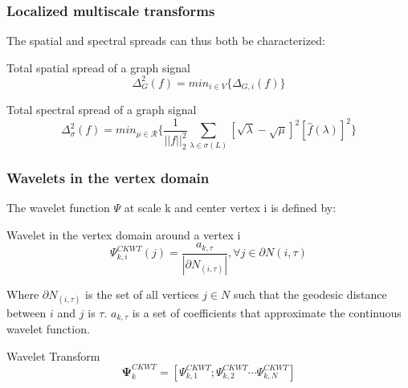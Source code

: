 \documentclass{beamer}
\begin{document}
\begin{frame}
  \frametitle{Localized multiscale transforms}
  
  The spatial and spectral spreads can thus both be characterized:

  \begin{block}{Total spatial spread of a graph signal}
    \begin{equation}
      \Delta_{G}^2(f) = min_{i \in V} \{ \Delta_{G, i} (f) \}
    \end{equation}
  \end{block}  
  \begin{block}{Total spectral spread of a graph signal}
    \begin{equation}
      \Delta_{\sigma}^2(f) = min_{\mu \in \mathcal{R}} \bigg\{ \frac{1}{|| f ||_2^2} \sum_{\lambda \in \sigma(L)} [\sqrt{\lambda} - \sqrt{\mu}]^2 [\hat{f}(\lambda)]^2 \bigg\}
    \end{equation}
  \end{block}  
 \end{frame} 
  
 \begin{frame}
   \frametitle{Wavelets in the vertex domain}
    The wavelet function $\Psi$ at scale k and center vertex i is defined by:

  \begin{block}{Wavelet in the vertex domain around a vertex i}
  \begin{equation}
  \Psi_{k,i}^{CKWT} (j) = \frac{a_{k, \tau}}{|\partial N_{(i, \tau)}|}, \forall j \in \partial N(i, \tau)
  \end{equation}
  \end{block}

  Where $\partial N_{(i, \tau)}$ is the set of all vertices $j \in N$ such that the geodesic distance between $i$ and $j$ is $\tau$. $a_{k, \tau}$ is a set of coefficients that approximate the continuous wavelet function. 

  \begin{block}{Wavelet Transform}
  \begin{equation}
  \mathbf{\Psi}_{k}^{CKWT} = [\Psi_{k,1}^{CKWT} ; \Psi_{k,2}^{CKWT} \cdots \Psi_{k,N}^{CKWT}]
  \end{equation}
  \end{block}
 
 \end{frame}
 
\end{document}
